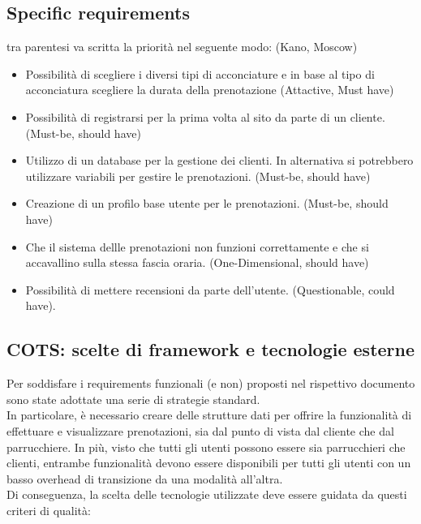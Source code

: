 \documentclass{article}
\begin{document}
\subsection {Specific requirements}
tra parentesi va scritta la priorità nel seguente modo: (Kano, Moscow)
\begin{itemize}
\item Possibilità di scegliere i diversi tipi di acconciature e in 
base al tipo di acconciatura scegliere la durata della prenotazione (Attactive, Must have)
\item Possibilità di registrarsi per la prima volta al sito da parte di un cliente. (Must-be, should have)
\item Utilizzo di un database per la gestione dei clienti. In alternativa si potrebbero utilizzare 
variabili per gestire le prenotazioni. (Must-be, should have)
\item Creazione di un profilo base utente per le prenotazioni. (Must-be, should have)
\item Che il sistema dellle prenotazioni non funzioni correttamente 
e che si accavallino sulla stessa fascia oraria. (One-Dimensional, should have)
\item Possibilità di mettere recensioni da parte dell'utente. (Questionable, could have).

\end{itemize}

\subsection {COTS: scelte di framework e tecnologie esterne}

Per soddisfare i requirements funzionali (e non) proposti nel rispettivo documento sono state adottate una serie di strategie standard. 
\\In particolare, è necessario creare delle strutture dati per offrire la funzionalità di effettuare e visualizzare prenotazioni, sia dal punto di vista dal cliente che dal parrucchiere. In più, visto che tutti gli utenti possono essere sia parrucchieri che clienti, entrambe funzionalità devono essere disponibili per tutti gli utenti con un basso overhead di transizione da una modalità all’altra. 
\\Di conseguenza, la scelta delle tecnologie utilizzate deve essere guidata da questi criteri di qualità:
\end{document}
